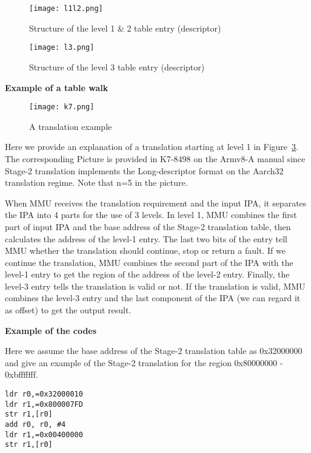 \begin{figure}[htb]
	\centering
	\texttt{[image: l1l2.png]}
	\caption{Structure of the level 1 \& 2 table entry (descriptor)}
	\label{fig:l1l2}
\end{figure}

\begin{figure}[htb]
	\centering
	\texttt{[image: l3.png]}
	\caption{Structure of the level 3 table entry (descriptor)}
	\label{fig:l3}
\end{figure}

\vspace{10pt}
\textbf{Example of a table walk}
\vspace{10pt}


\begin{figure}[htbp]
	\centering
	\texttt{[image: k7.png]}
	\caption{A translation example}
	\label{fig:k7}
\end{figure}

Here we provide an explanation of a translation starting at level 1 in Figure~\ref{fig:k7}. The corresponding Picture is provided in K7-8498 on the Armv8-A manual since Stage-2 translation implements the Long-descriptor format on the Aarch32 translation regime. Note that n=5 in the picture.

When MMU receives the translation requirement and the input IPA, it separates the IPA into 4 parts for the use of 3 levels.
In level 1, MMU combines the first part of input IPA and the base address of the Stage-2 translation table, then calculates the address of the level-1 entry.
The last two bits of the entry tell MMU whether the translation should continue, stop or return a fault.
If we continue the translation, MMU combines the second part of the IPA with the level-1 entry to get the region of the address of the level-2 entry. Finally, the level-3 entry tells the translation is valid or not. If the translation is valid, MMU combines the level-3 entry and the last component of the IPA (we can regard it as offset) to get the output result. 

\vspace{10pt}
\textbf{Example of the codes}
\vspace{10pt}

Here we assume the base address of the Stage-2 translation table as 0x32000000 and give an example of the Stage-2 translation for the region 0x80000000 - 0xbfffffff.

\begin{lstlisting}
ldr r0,=0x32000010
ldr r1,=0x800007FD
str r1,[r0]
add r0,	r0,	#4
ldr r1,=0x00400000
str r1,[r0]
\end{lstlisting}

